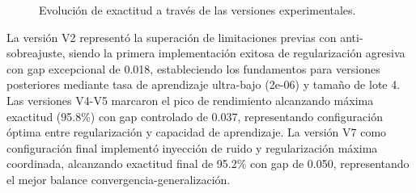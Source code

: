 \begin{table}[htbp]
\centering
{}
\caption{Evolución de configuraciones y resultados entre versiones experimentales.}
\label{tab:configuraciones_tecnicas}
\end{table}



\begin{figure}[htbp]
\centering
{}
\caption{Evolución de exactitud a través de las versiones experimentales.}
\label{fig:evolucion_rendimiento}
\end{figure}

La versión V2 representó la superación de limitaciones previas con anti-sobreajuste, siendo la primera implementación exitosa de regularización agresiva con gap excepcional de 0.018, estableciendo los fundamentos para versiones posteriores mediante tasa de aprendizaje ultra-bajo (2e-06) y tamaño de lote 4. Las versiones V4-V5 marcaron el pico de rendimiento alcanzando máxima exactitud (95.8\%) con gap controlado de 0.037, representando configuración óptima entre regularización y capacidad de aprendizaje. La versión V7 como configuración final implementó inyección de ruido y regularización máxima coordinada, alcanzando exactitud final de 95.2\% con gap de 0.050, representando el mejor balance convergencia-generalización.

